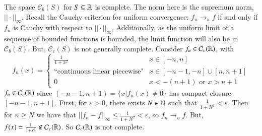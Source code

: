 \begin{eg}
    The space $\mathcal{C}_b(S)$ for $S \subseteq \mathbb R$ is complete. The norm here is the supremum norm, $||\cdot||_{\infty}$. Recall the Cauchy criterion for uniform convergence: $f_n\rightarrow_uf$ if and only if $f_n$ is Cauchy with respect to $||\cdot||_{\infty}$. Additionally, as the uniform limit of a sequence of bounded functions is bounded, the limit function will also be in $\mathcal{C}_b(S)$. But, $\mathcal{C}_c(S)$ is not generally complete. Consider $f_n \in \mathcal{C}_c(\mathbb R)$, with $$f_n(x) = \left\{\begin{array}{cc}\frac{1}{1+x^2} & x \in [-n,n] \\ \text{``continuous linear piecewise"} & x \in [-n-1,-n]\cup[n,n+1] \\ 0 & x < -(n+1)\text{ or } x > n+1\end{array}\right.$$ $f_n \in \mathcal{C}_c(\mathbb R)$ since $(-n-1,n+1) = \{x\vert f_n(x) \neq 0\}$ has compact closure $[-n-1,n+1]$. First, for $\varepsilon > 0$, there exists $N \in \mathbb N$ such that $\frac{1}{1+N^2} < \varepsilon$. Then for $n \geq N$ we have that $||f_n-f||_{\infty} \leq \frac{1}{1+N^2} < \varepsilon$, so $f_n\rightarrow_uf$. But, $f(x) = \frac{1}{1+x^2} \notin \mathcal{C}_c(\mathbb R)$. So $\mathcal{C}_c(\mathbb R)$ is not complete.
\end{eg}


